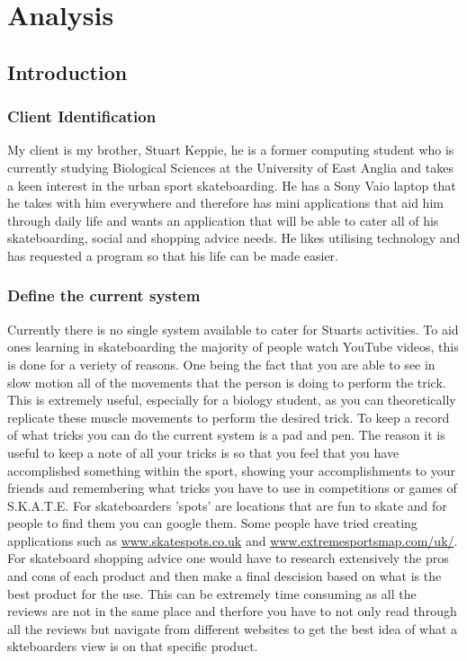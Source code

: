 \chapter{Analysis}

\section{Introduction}

\subsection{Client Identification}

My client is my brother, Stuart Keppie, he is a former computing student who is currently studying Biological Sciences at the University of East Anglia and takes a keen interest in the urban sport skateboarding. He has a Sony Vaio laptop that he takes with him everywhere and therefore has mini applications that aid him through daily life and wants an application that will be able to cater all of his skateboarding, social and shopping advice needs. He likes utilising technology and has requested a program so that his life can be made easier. 

\subsection{Define the current system}

Currently there is no single system available to cater for Stuarts activities. To aid ones learning in skateboarding the majority of people watch YouTube videos, this is done for a veriety of reasons. One being the fact that you are able to see in slow motion all of the movements that the person is doing to perform the trick. This is extremely useful, especially for a biology student, as you can theoretically replicate these muscle movements to perform the desired trick. To keep a record of what tricks you can do the current system is a pad and pen. The reason it is useful to keep a note of all your tricks is so that you feel that you have accomplished something within the sport, showing your accomplishments to your friends and remembering what tricks you have to use in competitions or games of S.K.A.T.E. For skateboarders 'spots' are locations that are fun to skate and for people to find them you can google them. Some people have tried creating applications such as \url{www.skatespots.co.uk} and \url{www.extremesportsmap.com/uk/}. For skateboard shopping advice one would have to research extensively the pros and cons of each product and then make a final descision based on what is the best product for the use. This can be extremely time consuming as all the reviews are not in the same place and therfore you have to not only read through all the reviews but navigate from different websites to get the best idea of what a skteboarders view is on that specific product.

